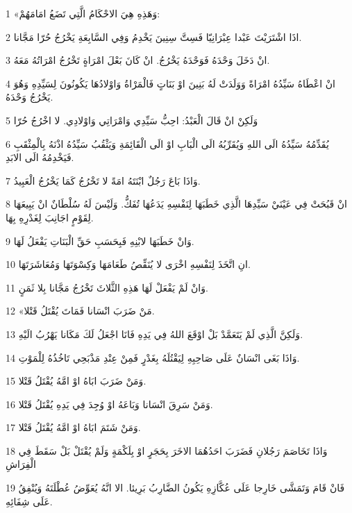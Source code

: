 \par 1 «وَهَذِهِ هِيَ الاحْكَامُ الَّتِي تَضَعُ امَامَهُمْ:
\par 2 اذَا اشْتَرَيْتَ عَبْدا عِبْرَانِيّا فَسِتَّ سِنِينَ يَخْدِمُ وَفِي السَّابِعَةِ يَخْرُجُ حُرّا مَجَّانا.
\par 3 انْ دَخَلَ وَحْدَهُ فَوَحْدَهُ يَخْرُجُ. انْ كَانَ بَعْلَ امْرَاةٍ تَخْرُجُ امْرَاتُهُ مَعَهُ.
\par 4 انْ اعْطَاهُ سَيِّدُهُ امْرَاةً وَوَلَدَتْ لَهُ بَنِينَ اوْ بَنَاتٍ فَالْمَرْاةُ وَاوْلادُهَا يَكُونُونَ لِسَيِّدِهِ وَهُوَ يَخْرُجُ وَحْدَهُ.
\par 5 وَلَكِنْ انْ قَالَ الْعَبْدُ: احِبُّ سَيِّدِي وَامْرَاتِي وَاوْلادِي. لا اخْرُجُ حُرّا
\par 6 يُقَدِّمُهُ سَيِّدُهُ الَى اللهِ وَيُقَرِّبُهُ الَى الْبَابِ اوْ الَى الْقَائِمَةِ وَيَثْقُبُ سَيِّدُهُ اذْنَهُ بِالْمِثْقَبِ فَيَخْدِمُهُ الَى الابَدِ.
\par 7 وَاذَا بَاعَ رَجُلٌ ابْنَتَهُ امَةً لا تَخْرُجُ كَمَا يَخْرُجُ الْعَبِيدُ.
\par 8 انْ قَبُحَتْ فِي عَيْنَيْ سَيِّدِهَا الَّذِي خَطَبَهَا لِنَفْسِهِ يَدَعُهَا تُفَكُّ. وَلَيْسَ لَهُ سُلْطَانٌ انْ يَبِيعَهَا لِقَوْمٍ اجَانِبَ لِغَدْرِهِ بِهَا.
\par 9 وَانْ خَطَبَهَا لابْنِهِ فَبِحَسَبِ حَقِّ الْبَنَاتِ يَفْعَلُ لَهَا.
\par 10 انِ اتَّخَذَ لِنَفْسِهِ اخْرَى لا يُنَقِّصُ طَعَامَهَا وَكِسْوَتَهَا وَمُعَاشَرَتَهَا.
\par 11 وَانْ لَمْ يَفْعَلْ لَهَا هَذِهِ الثَّلاثَ تَخْرُجُ مَجَّانا بِلا ثَمَنٍ.
\par 12 «مَنْ ضَرَبَ انْسَانا فَمَاتَ يُقْتَلُ قَتْلا.
\par 13 وَلَكِنَّ الَّذِي لَمْ يَتَعَمَّدْ بَلْ اوْقَعَ اللهُ فِي يَدِهِ فَانَا اجْعَلُ لَكَ مَكَانا يَهْرُبُ الَيْهِ.
\par 14 وَاذَا بَغَى انْسَانٌ عَلَى صَاحِبِهِ لِيَقْتُلَهُ بِغَدْرٍ فَمِنْ عِنْدِ مَذْبَحِي تَاخُذُهُ لِلْمَوْتِ.
\par 15 وَمَنْ ضَرَبَ ابَاهُ اوْ امَّهُ يُقْتَلُ قَتْلا.
\par 16 وَمَنْ سَرِقَ انْسَانا وَبَاعَهُ اوْ وُجِدَ فِي يَدِهِ يُقْتَلُ قَتْلا.
\par 17 وَمَنْ شَتَمَ ابَاهُ اوْ امَّهُ يُقْتَلُ قَتْلا.
\par 18 وَاذَا تَخَاصَمَ رَجُلانِ فَضَرَبَ احَدُهُمَا الاخَرَ بِحَجَرٍ اوْ بِلَكْمَةٍ وَلَمْ يُقْتَلْ بَلْ سَقَطَ فِي الْفِرَاشِ
\par 19 فَانْ قَامَ وَتَمَشَّى خَارِجا عَلَى عُكَّازِهِ يَكُونُ الضَّارِبُ بَرِيئا. الا انَّهُ يُعَوِّضُ عُطْلَتَهُ وَيُنْفِقُ عَلَى شِفَائِهِ.
